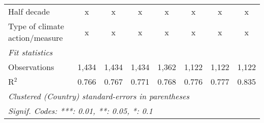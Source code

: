 \begin{tabular}{lccccccc}
   Half decade                                                                                 & x       & x       & x            & x             & x             & x             & x\\  
   Type of climate action/measure                                                              & x       & x       & x            & x             & x             & x             & x\\  
   \midrule \emph{Fit statistics}\\
   Observations                                                                                & 1,434   & 1,434   & 1,434        & 1,362         & 1,122         & 1,122         & 1,122\\  
   R$^2$                                                                                       & 0.766   & 0.767   & 0.771        & 0.768         & 0.776         & 0.777         & 0.835\\  
   \midrule
   \multicolumn{8}{l}{\emph{Clustered (Country) standard-errors in parentheses}}\\
   \multicolumn{8}{l}{\emph{Signif. Codes: ***: 0.01, **: 0.05, *: 0.1}}\\
\end{tabular}
\par\endgroup


